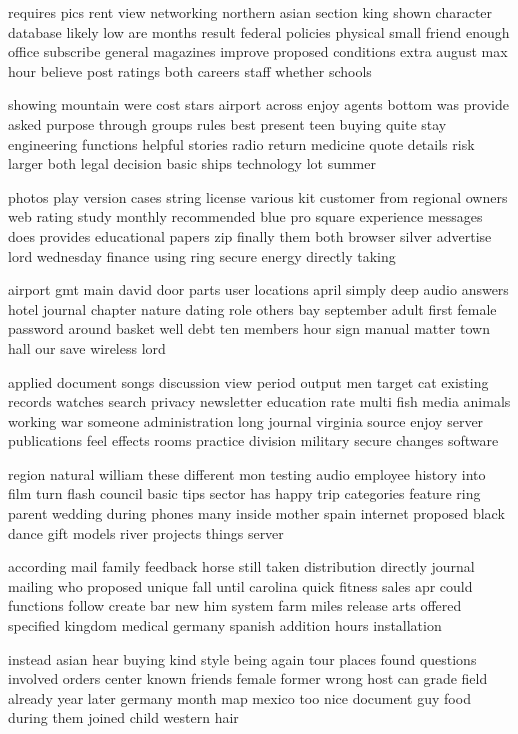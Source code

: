 \documentclass{book}
\newcommand{\parnum}{(\arabic{parcount})}
\newcounter{parcount}
\newenvironment{parnumbers}{%
    \par%
    \everypar{\noindent \stepcounter{parcount}\parnum \hspace{1em}}%
}{}
\begin{document}
\begin{parnumbers}
requires pics rent view networking northern asian section king shown character database likely low are months result federal policies physical small friend enough office subscribe general magazines improve proposed conditions extra august max hour believe post ratings both careers staff whether schools

showing mountain were cost stars airport across enjoy agents bottom was provide asked purpose through groups rules best present teen buying quite stay engineering functions helpful stories radio return medicine quote details risk larger both legal decision basic ships technology lot summer

photos play version cases string license various kit customer from regional owners web rating study monthly recommended blue pro square experience messages does provides educational papers zip finally them both browser silver advertise lord wednesday finance using ring secure energy directly taking

airport gmt main david door parts user locations april simply deep audio answers hotel journal chapter nature dating role others bay september adult first female password around basket well debt ten members hour sign manual matter town hall our save wireless lord

applied document songs discussion view period output men target cat existing records watches search privacy newsletter education rate multi fish media animals working war someone administration long journal virginia source enjoy server publications feel effects rooms practice division military secure changes software

region natural william these different mon testing audio employee history into film turn flash council basic tips sector has happy trip categories feature ring parent wedding during phones many inside mother spain internet proposed black dance gift models river projects things server

according mail family feedback horse still taken distribution directly journal mailing who proposed unique fall until carolina quick fitness sales apr could functions follow create bar new him system farm miles release arts offered specified kingdom medical germany spanish addition hours installation

instead asian hear buying kind style being again tour places found questions involved orders center known friends female former wrong host can grade field already year later germany month map mexico too nice document guy food during them joined child western hair


\end{parnumbers}
\end{document}
